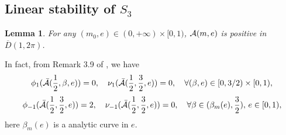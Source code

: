 \documentclass[11pt]{article}
\newtheorem{lemma}{Lemma}[section]
\def\cA{{\cal A}}
\def\ol#1{\overline{#1}}
\begin{document}
\subsection{Linear stability of \texorpdfstring{$S_3$}{S\_3}}

\begin{lemma}
    For any $(m_0,e)\in(0,+\infty)\times[0,1)$,
    $\cA(m,e)$ is positive in $\ol{D}(1,2\pi)$.
\end{lemma}

In fact, from Remark 3.9 of \cite{Hu2020}, we have
\begin{equation}
    \phi_{1}(\bar\cA({1\over2},\beta,e))=0,
    \quad
    \nu_{1}(\bar\cA({1\over2},{3\over2},e))=0,
    \quad
    \forall (\beta,e)\in[0,3/2)\times[0,1),
     \end{equation}
    \begin{equation}
      \phi_{-1}(\bar\cA({1\over2},{3\over2},e))=2,
    \quad
    \nu_{-1}(\bar\cA({1\over2},{3\over2},e))=0,
    \quad
    \forall \beta\in (\beta_m(e),{3\over2}), \, e\in[0,1),
\end{equation}
here $\beta_m(e)$ is a analytic curve in $e$. 
\end{document}

